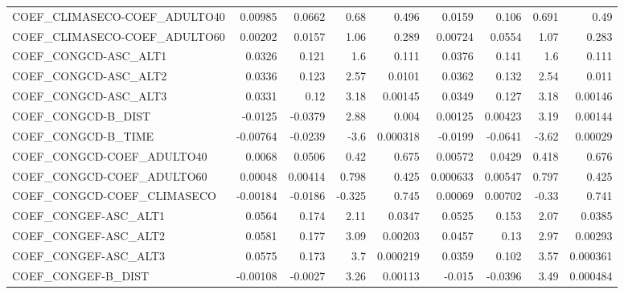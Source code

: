 \begin{tabular}{lrrrrrrrr}
COEF\_CLIMASECO-COEF\_ADULTO40      &     0.00985 &       0.0662 &    0.68 &    0.496 &     0.0159 &       0.106 &        0.691 &          0.49 \\
COEF\_CLIMASECO-COEF\_ADULTO60      &     0.00202 &       0.0157 &    1.06 &    0.289 &    0.00724 &      0.0554 &         1.07 &         0.283 \\
COEF\_CONGCD-ASC\_ALT1              &      0.0326 &        0.121 &     1.6 &    0.111 &     0.0376 &       0.141 &          1.6 &         0.111 \\
COEF\_CONGCD-ASC\_ALT2              &      0.0336 &        0.123 &    2.57 &   0.0101 &     0.0362 &       0.132 &         2.54 &         0.011 \\
COEF\_CONGCD-ASC\_ALT3              &      0.0331 &         0.12 &    3.18 &  0.00145 &     0.0349 &       0.127 &         3.18 &       0.00146 \\
COEF\_CONGCD-B\_DIST                &     -0.0125 &      -0.0379 &    2.88 &    0.004 &    0.00125 &     0.00423 &         3.19 &       0.00144 \\
COEF\_CONGCD-B\_TIME                &    -0.00764 &      -0.0239 &    -3.6 & 0.000318 &    -0.0199 &     -0.0641 &        -3.62 &       0.00029 \\
COEF\_CONGCD-COEF\_ADULTO40         &      0.0068 &       0.0506 &    0.42 &    0.675 &    0.00572 &      0.0429 &        0.418 &         0.676 \\
COEF\_CONGCD-COEF\_ADULTO60         &     0.00048 &      0.00414 &   0.798 &    0.425 &   0.000633 &     0.00547 &        0.797 &         0.425 \\
COEF\_CONGCD-COEF\_CLIMASECO        &    -0.00184 &      -0.0186 &  -0.325 &    0.745 &    0.00069 &     0.00702 &        -0.33 &         0.741 \\
COEF\_CONGEF-ASC\_ALT1              &      0.0564 &        0.174 &    2.11 &   0.0347 &     0.0525 &       0.153 &         2.07 &        0.0385 \\
COEF\_CONGEF-ASC\_ALT2              &      0.0581 &        0.177 &    3.09 &  0.00203 &     0.0457 &        0.13 &         2.97 &       0.00293 \\
COEF\_CONGEF-ASC\_ALT3              &      0.0575 &        0.173 &     3.7 & 0.000219 &     0.0359 &       0.102 &         3.57 &      0.000361 \\
COEF\_CONGEF-B\_DIST                &    -0.00108 &      -0.0027 &    3.26 &  0.00113 &     -0.015 &     -0.0396 &         3.49 &      0.000484 \\

\end{tabular}
